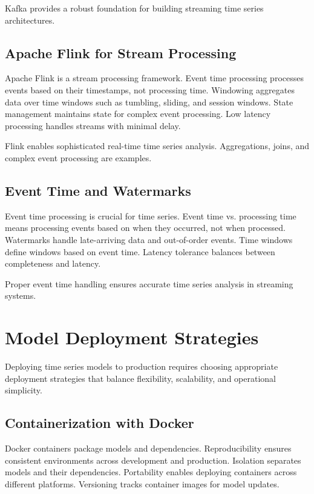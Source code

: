 Kafka provides a robust foundation for building streaming time series architectures.

\subsection{Apache Flink for Stream Processing}

Apache Flink is a stream processing framework. Event time processing processes events based on their timestamps, not processing time. Windowing aggregates data over time windows such as tumbling, sliding, and session windows. State management maintains state for complex event processing. Low latency processing handles streams with minimal delay.

Flink enables sophisticated real-time time series analysis. Aggregations, joins, and complex event processing are examples.

\subsection{Event Time and Watermarks}

Event time processing is crucial for time series. Event time vs. processing time means processing events based on when they occurred, not when processed. Watermarks handle late-arriving data and out-of-order events. Time windows define windows based on event time. Latency tolerance balances between completeness and latency.

Proper event time handling ensures accurate time series analysis in streaming systems.

\section{Model Deployment Strategies}

Deploying time series models to production requires choosing appropriate deployment strategies that balance flexibility, scalability, and operational simplicity.

\subsection{Containerization with Docker}

Docker containers package models and dependencies. Reproducibility ensures consistent environments across development and production. Isolation separates models and their dependencies. Portability enables deploying containers across different platforms. Versioning tracks container images for model updates.

